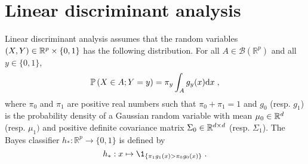 \section{Linear discriminant analysis}
Linear discriminant analysis assumes that the random variables $(X,Y)\in \mathbb{R}^p\times\{0,1\}$ has the following distribution. For all $A\in \mathcal{B}(\mathbb{R}^p)$ and all $y\in\{0,1\}$,
\[
\mathbb{P}\left(X\in A;Y=y\right) = \pi_y \int_A g_y(x) \mathrm{d} x\;,
\]
where $\pi_{0}$ and $\pi_1$ are positive real numbers such that $\pi_0+\pi_{1}=1$ and $g_0$ (resp. $g_1$) is the probability density of a Gaussian random variable with mean $\mu_0\in\mathbb{R}^d$ (resp. $\mu_1)$ and positive definite covariance matrix $\Sigma_0\in \mathbb{R}^{d\times d}$ (resp. $\Sigma_1$).  The Bayes classifier $h_{*}:\mathbb{R}^p\to\{0,1\}$ is defined by
\[
h_{*}:x \mapsto \1_{\{\pi_{1}g_{1}(x)>\pi_{0}g_{0}(x)\}}\eqsp.
\]

